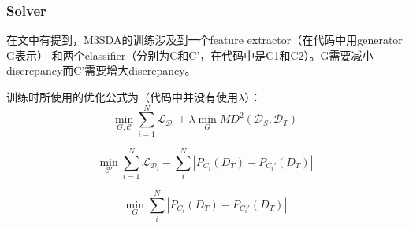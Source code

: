 \documentclass[UTF8]{ctexart}
\begin{document}
            \subsubsection{Solver}
                在文中有提到，M3SDA的训练涉及到一个feature extractor（在代码中用generator G表示）
                和两个classifier（分别为C和C'，在代码中是C1和C2）。G需要减小discrepancy而C'需要增大discrepancy。

                训练时所使用的优化公式为（代码中并没有使用$\lambda$）：
                $$
                \min_{G,\mathcal C}\sum_{i=1}^{N}\mathcal L_{\mathcal D_i} + \lambda \min_{G}MD^2(\mathcal D_S,\mathcal D_T)
                $$

                $$
                \min_{\mathcal C'}\sum_{i=1}^{N}\mathcal L_{\mathcal D_i} - \sum_{i}^N |P_{C_i}(D_T)-P_{C_i'}(D_T)|
                $$

                $$
                \min_{G} \sum_{i}^N |P_{C_i}(D_T)-P_{C_i'}(D_T)|
                $$
\end{document}
